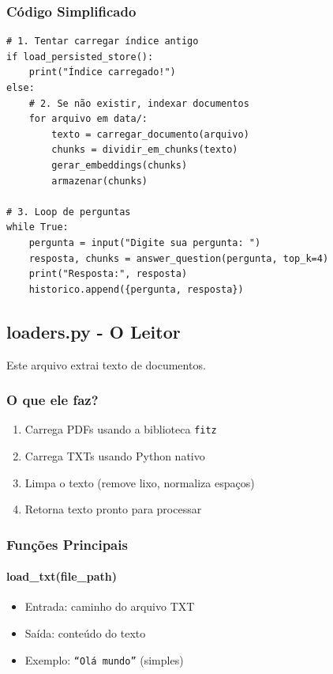 \documentclass[12pt,a4paper]{article}
\begin{document}
\subsubsection{Código Simplificado}

\begin{lstlisting}
# 1. Tentar carregar índice antigo
if load_persisted_store():
    print("Índice carregado!")
else:
    # 2. Se não existir, indexar documentos
    for arquivo em data/:
        texto = carregar_documento(arquivo)
        chunks = dividir_em_chunks(texto)
        gerar_embeddings(chunks)
        armazenar(chunks)

# 3. Loop de perguntas
while True:
    pergunta = input("Digite sua pergunta: ")
    resposta, chunks = answer_question(pergunta, top_k=4)
    print("Resposta:", resposta)
    historico.append({pergunta, resposta})
\end{lstlisting}

\subsection{loaders.py - O Leitor}

Este arquivo extrai texto de documentos.

\subsubsection{O que ele faz?}

\begin{enumerate}
    \item Carrega PDFs usando a biblioteca \texttt{fitz}
    \item Carrega TXTs usando Python nativo
    \item Limpa o texto (remove lixo, normaliza espaços)
    \item Retorna texto pronto para processar
\end{enumerate}

\subsubsection{Funções Principais}

\paragraph{load\_txt(file\_path)}
\begin{itemize}
    \item Entrada: caminho do arquivo TXT
    \item Saída: conteúdo do texto
    \item Exemplo: \texttt{``Olá mundo''} (simples)
\end{itemize}
\end{document}
